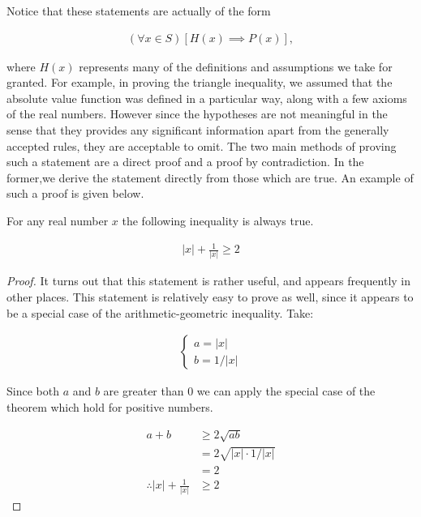 Notice that these statements are actually of the form

\begin{align*}
	(\forall x \in S)[H(x) \implies P(x)],
\end{align*}

where $H(x)$ represents many of the definitions and assumptions we take for granted. For example, in proving the triangle inequality, we assumed that the absolute value function was defined in a particular way, along with a few axioms of the real numbers. However since the hypotheses are not meaningful in the sense that they provides any significant information apart from the generally accepted rules, they are acceptable to omit. The two main methods of proving such a statement are a direct proof and a proof by contradiction. In the former,we derive the statement directly from those which are true. An example of such a proof is given below.

\vspace{\baselineskip}
\begin{theorem}
	For any real number $x$ the following inequality is always true.
	
	\begin{align}
		|x| + \frac{1}{|x|} \ge 2
	\end{align}
\end{theorem}

\begin{proof}
	It turns out that this statement is rather useful, and  appears frequently in other places. This statement is relatively easy to prove as well, since it appears to be a special case of the arithmetic-geometric inequality. Take:
	
	\begin{align*}
		\begin{cases}
			a = |x| \\
			b = 1 / |x|
		\end{cases}
	\end{align*}
		
	Since both $a$ and $b$ are greater than 0 we can apply the special case of the theorem which hold for positive numbers.
	
	\begin{align*}
		a + b &\ge 2 \sqrt{ab} \\
		&= 2 \sqrt{|x| \cdot 1 / |x|} \\
		&= 2 \\
		\therefore |x| + \frac{1}{|x|} &\ge 2
	\end{align*}
\end{proof}
\vspace{\baselineskip}

